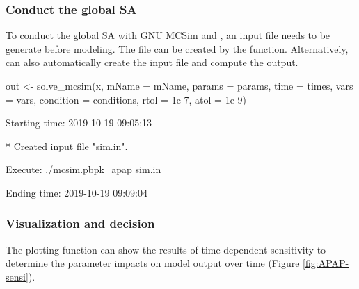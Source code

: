 \hypertarget{conduct-the-global-sa}{%
\subsubsection{Conduct the global SA}\label{conduct-the-global-sa}}

To conduct the global SA with GNU MCSim and , an input
file needs to be generate before modeling. The file can be created by
the  function. Alternatively, 
can also automatically create the input file and compute the output.

\begin{Schunk}
\begin{Sinput}
out <- solve_mcsim(x, mName = mName,
                   params = params, 
                   time = times, 
                   vars = vars,
                   condition = conditions, 
                   rtol = 1e-7, atol = 1e-9)
\end{Sinput}
\begin{Soutput}
  Starting time: 2019-10-19 09:05:13
\end{Soutput}
\begin{Soutput}
  * Created input file "sim.in".
\end{Soutput}
\begin{Soutput}
  Execute: ./mcsim.pbpk_apap sim.in
\end{Soutput}
\begin{Soutput}
  Ending time: 2019-10-19 09:09:04
\end{Soutput}
\end{Schunk}

\hypertarget{visualization-and-decision}{%
\subsubsection{Visualization and
decision}\label{visualization-and-decision}}

The plotting function can show the results of time-dependent sensitivity
to determine the parameter impacts on model output over time (Figure
\ref{fig:APAP-sensi}).

